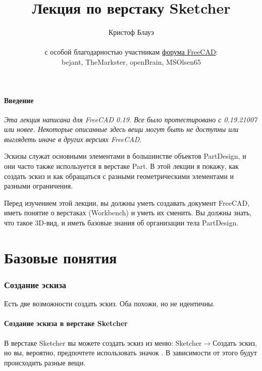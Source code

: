 \documentclass[12pt,titlepage]{article}
\title{Лекция по верстаку Sketcher}
\author{Кристоф Блауэ\\
\\
\scriptsize с особой благодарностью участникам \href {https://forum.freecadweb.org} {форума FreeCAD}:\\
\small bejant,
TheMarkster,
openBrain,
MSOlsen65
}
\newcommand{\menu}{\mbox{$\rightarrow$}}
\newcommand{\icon}[1]{\raisebox{-1em}{\rule{0pt}{27pt}\texttt{[image: images/\#1]}}}
\let\partOrigin\part
\renewcommand\part{\newpage\partOrigin}
\newcommand{\currentVersion}{0.19.21007}
\begin{document}
\maketitle
\setcounter{page}{2}

\tableofcontents
\newpage

\subsection*{Введение}
{\em Эта лекция написана для FreeCAD 0.19. Все было протестировано с
\currentVersion{} или новее. Некоторые описанные здесь вещи могут быть не доступны или 
выглядеть иначе в других версиях FreeCAD}.
\vspace{2.5em}

Эскизы служат основными элементами в большинстве объектов PartDesign, и они часто
также используется в верстаке Part. В этой лекции я покажу, как создать
эскиз и как обращаться с разными геометрическими элементами и разными
ограничения.

Перед изучением этой лекции, вы должны уметь создавать документ FreeCAD, иметь понятие о верстаках (Workbench) и уметь их сменить.  Вы должны знать, что такое 3D-вид, и иметь базовые знания об организации тела PartDesign.

\part{Базовые понятия}

\section{Создание эскиза}
Есть две возможности создать эскиз. Оба похожи, но не идентичны.

\subsection{Создание эскиза в верстаке Sketcher}
В верстаке Sketcher вы можете создать эскиз из меню: Sketcher\menu Создать эскиз, но вы, вероятно, предпочтете использовать значок \icon{Sketcher_NewSketch}. В зависимости от этого будут происходить разные вещи.
\end{document}
